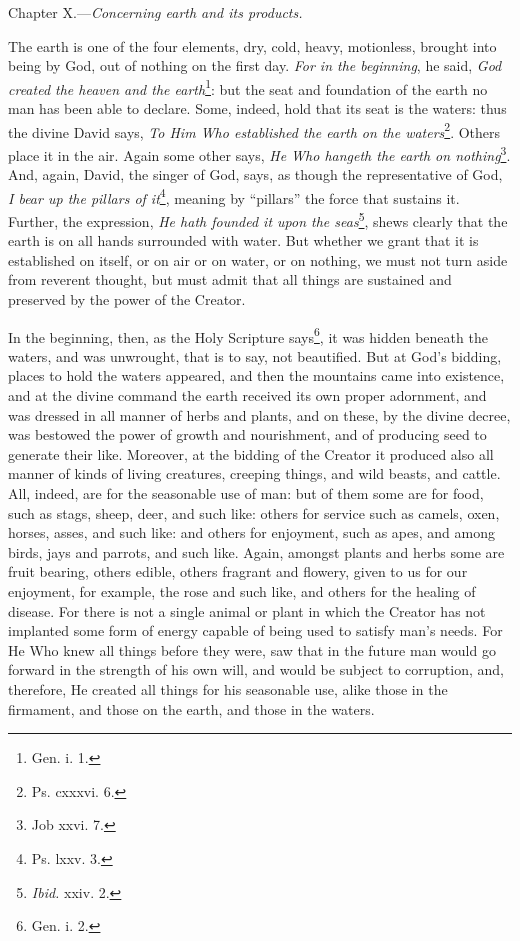 
Chapter X.—\emph{Concerning earth and its products.}

The earth is one of the four elements, dry, cold, heavy, motionless, brought into being by God, out of nothing on the first day. \emph{For in the beginning}, he said, \emph{God created the heaven and the earth}\footnote{Gen. i. 1.}: but the seat and foundation of the earth no man has been able to declare. Some, indeed, hold that its seat is the waters: thus the divine David says, \emph{To Him Who established the earth on the waters}\footnote{Ps. cxxxvi. 6.}. Others place it in the air. Again some other says, \emph{He Who hangeth the earth on nothing}\footnote{Job xxvi. 7.}. And, again, David, the singer of God, says, as though the representative of God, \emph{I bear up the pillars of it}\footnote{Ps. lxxv. 3.}, meaning by “pillars” the force that sustains it. Further, the expression, \emph{He hath founded it upon the seas}\footnote{\emph{Ibid.} xxiv. 2.}, shews clearly that the earth is on all hands surrounded with water. But whether we grant that it is established on itself, or on air or on water, or on nothing, we must not turn aside from reverent thought, but must admit that all things are sustained and preserved by the power of the Creator.

In the beginning, then, as the Holy Scripture says\footnote{Gen. i. 2.}, it was hidden beneath the waters, and was unwrought, that is to say, not beautified. But at God’s bidding, places to hold the waters appeared, and then the mountains came into existence, and at the divine command the earth received its own proper adornment, and was dressed in all manner of herbs and plants, and on these, by the divine decree, was bestowed the power of growth and nourishment, and of producing seed to generate their like. Moreover, at the bidding of the Creator it produced also all manner of kinds of living creatures, creeping things, and wild beasts, and cattle. All, indeed, are for the seasonable use of man: but of them some are for food, such as stags, sheep, deer, and such like: others for service such as camels, oxen, horses, asses, and such like: and others for enjoyment, such as apes, and among birds, jays and parrots, and such like. Again, amongst plants and herbs some are fruit bearing, others edible, others fragrant and flowery, given to us for our enjoyment, for example, the rose and such like, and others for the healing of disease. For there is not a single animal or plant in which the Creator has not implanted some form of energy capable of being used to satisfy man’s needs. For He Who knew all things before they were, saw that in the future man would go forward in the strength of his own will, and would be subject to corruption, and, therefore, He created all things for his seasonable use, alike those in the firmament, and those on the earth, and those in the waters.

